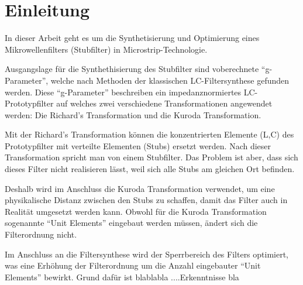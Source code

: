 \section{Einleitung}

In  dieser  Arbeit  geht  es  um die  Synthetisierung  und  Optimierung  eines
Mikrowellenfilters (Stubfilter) in Microstrip-Technologie.

Ausgangslage  für  die  Synthethisierung  des  Stubfilter  sind   voberechnete
``g-Parameter'',  welche  nach  Methoden  der   klassischen  LC-Filtersynthese
gefunden  werden.  Diese  ``g-Parameter'' beschreiben  ein  impedanznormiertes
LC-Prototypfilter    auf    welches    zwei    verschiedene   Transformationen
angewendet werden: Die Richard's Transformation und die Kuroda Transformation.

Mit der  Richard's Transformation können die konzentrierten Elemente (L,C) des
Prototypfilter mit verteilte Elementen (Stubs)  ersetzt  werden.  Nach  dieser
Transformation  spricht  man  von einem Stubfilter. Das Problem ist aber, dass
sich dieses Filter nicht realisieren lässt,  weil  sich alle Stubs am gleichen
Ort befinden.

Deshalb  wird  im Anschluss  die  Kuroda  Transformation  verwendet,  um  eine
physikalische Distanz zwischen den Stubs zu schaffen, damit das Filter auch in
Realit\"at  umgesetzt  werden  kann.  Obwohl  für  die  Kuroda  Transformation
sogenannte  ``Unit  Elements''  eingebaut  werden   müssen,  ändert  sich  die
Filterordnung nicht.

Im  Anschluss  an   die  Filtersynthese  wird  der  Sperrbereich  des  Filters
optimiert,  was  eine  Erhöhung  der Filterordnung um die  Anzahl  eingebauter
``Unit  Elements''  bewirkt.  Grund  dafür ist blablabla ....Erkenntnisse  bla

\newpage





